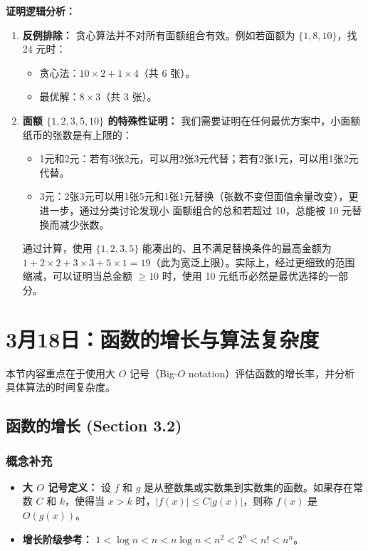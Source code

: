 \documentclass[11pt,UTF8]{article}
\begin{document}
\textbf{证明逻辑分析：}
\begin{enumerate}[1.]
    \item \textbf{反例排除：} 贪心算法并不对所有面额组合有效。例如若面额为 $\{1, 8, 10\}$，找 24 元时：
    \begin{itemize}
        \item 贪心法：$10 \times 2 + 1 \times 4$（共 6 张）。
        \item 最优解：$8 \times 3$（共 3 张）。
    \end{itemize}
    
    \item \textbf{面额 $\{1, 2, 3, 5, 10\}$ 的特殊性证明：}
    我们需要证明在任何最优方案中，小面额纸币的张数是有上限的：
    \begin{itemize}
        \item 1元和2元：若有3张2元，可以用2张3元代替；若有2张1元，可以用1张2元代替。
        \item 3元：2张3元可以用1张5元和1张1元替换（张数不变但面值余量改变），更进一步，通过分类讨论发现小
        面额组合的总和若超过 10，总能被 10 元替换而减少张数。
    \end{itemize}
    通过计算，使用 $\{1, 2, 3, 5\}$ 能凑出的、且不满足替换条件的最高金额为 $1+2\times 2+3\times 3+5\times 1 = 19$（此为宽泛上限）。实际上，经过更细致的范围缩减，可以证明当总金额 $\ge 10$ 时，使用 10 元纸币必然是最优选择的一部分。
\end{enumerate}



\section{3月18日：函数的增长与算法复杂度}

本节内容重点在于使用大 $O$ 记号（Big-$O$ notation）评估函数的增长率，并分析具体算法的时间复杂度。

\subsection{函数的增长 (Section 3.2)}

\subsubsection*{概念补充}
\begin{itemize}
    \item \textbf{大 $O$ 记号定义：} 设 $f$ 和 $g$ 是从整数集或实数集到实数集的函数。如果存在常数 $C$ 和 $k$，使得当 $x > k$ 时，$|f(x)| \le C|g(x)|$，则称 $f(x)$ 是 $O(g(x))$。
    \item \textbf{增长阶级参考：} $1 < \log n < n < n \log n < n^2 < 2^n < n! < n^n$。
\end{itemize}
\end{document}

